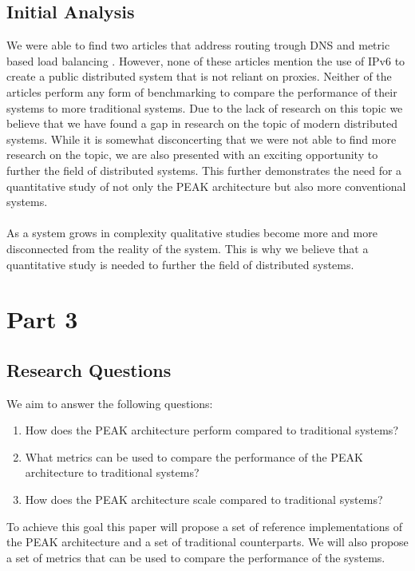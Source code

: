 \documentclass[12pt]{article}
\begin{document}
\subsection{Initial Analysis}
We were able to find two articles that address routing trough DNS and metric based load balancing \cite{heimonenPreprintPEAKProxy2024,canilhoAchievingMetricOriented2020}. 
However, none of these articles mention the use of IPv6 to create a public distributed system that is not reliant on proxies.
Neither of the articles perform any form of benchmarking to compare the performance of their systems to more traditional systems. 
Due to the lack of research on this topic we believe that we have found a gap in research on the topic of modern distributed systems.
While it is somewhat disconcerting that we were not able to find more research on the topic, we are 
also presented with an exciting opportunity to further the field of distributed systems.
This further demonstrates the need for a quantitative study of not only the PEAK architecture but also
more conventional systems.
\\
\\
As a system grows in complexity qualitative studies \cite{creswellResearchDesignQualitative} become more and more disconnected from the reality of the system.
This is why we believe that a quantitative study is needed to further the field of distributed systems.


\section{Part 3}
\subsection{Research Questions}
We aim to answer the following questions:
\begin{enumerate}
    \item How does the PEAK architecture perform compared to traditional systems?
    \item What metrics can be used to compare the performance of the PEAK architecture to traditional systems?
    \item How does the PEAK architecture scale compared to traditional systems?
\end{enumerate}
To achieve this goal this paper will propose a set of reference implementations of the PEAK architecture and a set of traditional counterparts.
We will also propose a set of metrics that can be used to compare the performance of the systems.
\end{document}
